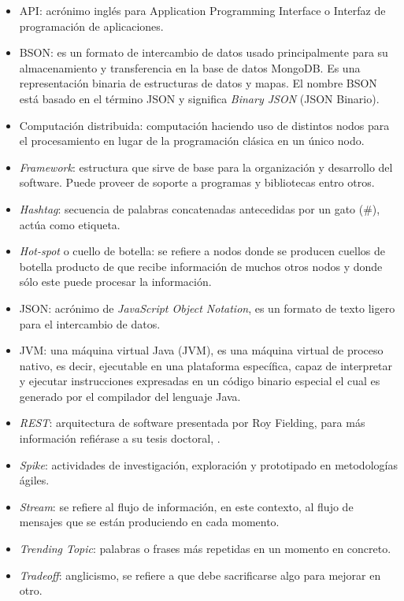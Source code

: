 \begin{glosario}

\begin{itemize}
\item API: acrónimo inglés para Application Programming Interface o Interfaz de programación de aplicaciones.
\item BSON: es un formato de intercambio de datos usado principalmente para su almacenamiento y transferencia en la base de datos MongoDB. Es una representación binaria de estructuras de datos y mapas. El nombre BSON está basado en el término JSON y significa \textit{Binary JSON} (JSON Binario).
\item Computación distribuida: computación haciendo uso de distintos nodos para el procesamiento en lugar de la programación clásica en un único nodo.
\item \textit{Framework}: estructura que sirve de base para la organización y desarrollo del software. Puede proveer de soporte a programas y bibliotecas entro otros.
\item \textit{Hashtag}: secuencia de palabras concatenadas antecedidas por un gato (\#), actúa como etiqueta.
\item \textit{Hot-spot} o cuello de botella: se refiere a nodos donde se producen cuellos de botella producto de que recibe información de muchos otros nodos y donde sólo este puede procesar la información.
\item JSON: acrónimo de \textit{JavaScript Object Notation}, es un formato de texto ligero para el intercambio de datos.
\item JVM: una máquina virtual Java (JVM), es una máquina virtual de proceso nativo, es decir, ejecutable en una plataforma específica, capaz de interpretar y ejecutar instrucciones expresadas en un código binario especial el cual es generado por el compilador del lenguaje Java.
\item \textit{REST}: arquitectura de software presentada por Roy Fielding, para más información refiérase a su tesis doctoral, \cite{Fielding}.
\item \textit{Spike}: actividades de investigación, exploración y prototipado en metodologías ágiles.
\item \textit{Stream}: se refiere al flujo de información, en este contexto, al flujo de mensajes que se están produciendo en cada momento.
\item \textit{Trending Topic}: palabras o frases más repetidas en un momento en concreto.
\item \textit{Tradeoff}: anglicismo, se refiere a que debe sacrificarse algo para mejorar en otro.

\end{itemize}
\end{glosario}
